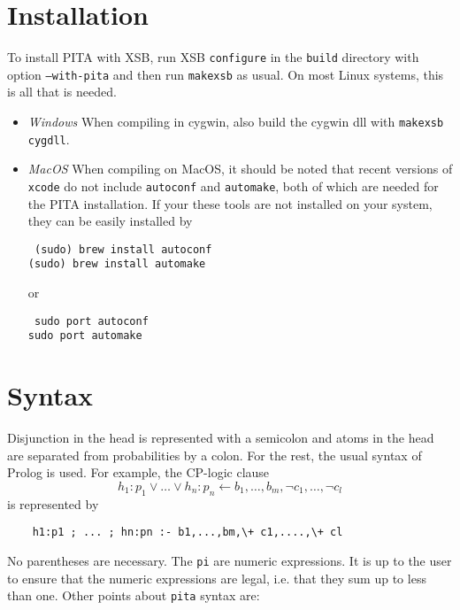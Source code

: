 \section{Installation}

To install PITA with XSB, run XSB \texttt{configure} in the
\texttt{build} directory with option \texttt{--with-pita} and then run
\texttt{makexsb} as usual.  On most Linux systems, this is all that is
needed.

\begin{itemize}
\item {\em Windows} When compiling in cygwin, also build the cygwin
  dll with \texttt{makexsb cygdll}.

\item {\em MacOS} When compiling on MacOS, it should be noted that
  recent versions of {\tt xcode} do not include {\tt autoconf} and
  {\tt automake}, both of which are needed for the PITA installation.
  If your these tools are not installed on your system, they can be
  easily installed by

{\tt 
\noindent
(sudo) brew install autoconf \\
(sudo) brew install automake
}

\noindent
or 

{\tt 
\noindent
sudo port autoconf \\
sudo port automake
}
\end{itemize}

\section{Syntax} \label{sec:pita-syntax}

Disjunction in the head is represented with a semicolon and atoms in the head are separated from probabilities by a colon. For the rest, the usual syntax of Prolog is used.
For example, the  CP-logic clause
$$h_1:p_1\vee \ldots \vee h_n:p_n\leftarrow b_1,\dots,b_m ,\neg c_1,\ldots,\neg c_l$$
is represented by
\begin{verbatim}
    h1:p1 ; ... ; hn:pn :- b1,...,bm,\+ c1,....,\+ cl
\end{verbatim}
No parentheses are necessary. The \texttt{pi} are numeric
expressions. It is up to the user to ensure that the numeric
expressions are legal, i.e. that they sum up to less than one.
Other points about {\tt pita} syntax are: 

